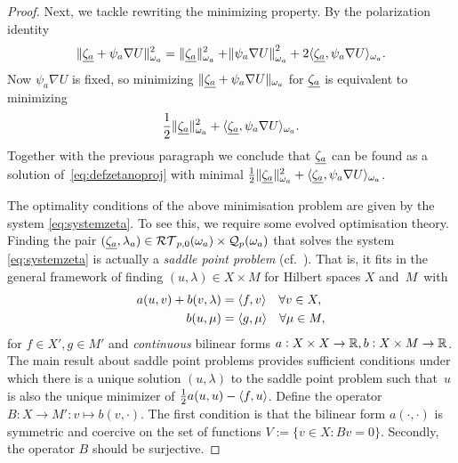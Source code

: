 \documentclass[thesis.tex]{subfiles}
\begin{document}
\begin{proof}
%
  Next, we tackle rewriting the minimizing property. By the polarization identity
  \[
    \| \underline{\zeta_a} + \psi_a \nabla U \|_{\omega_a}^2 = \| \underline{\zeta_a} \|_{\omega_a}^2 + \norm{\psi_a \nabla U}^2_{\omega_a} + 2 \langle \underline{\zeta_a}, \psi_a \nabla 
    U \rangle_{\omega_a}.
  \]
  Now $\psi_a \nabla U$ is fixed,  so minimizing $\| \underline{\zeta_a} + \psi_a \nabla U \|_{\omega_a}$ for $\underline{\zeta_a}$ is equivalent to minimizing
  \[
    \frac{1}{2} \| \underline{\zeta_a} \|^2_{\omega_a} + \langle \underline{\zeta_a}, \psi_a \nabla U \rangle_{\omega_a}.
  \]
  Together with the previous paragraph we conclude that $\underline{\zeta_a}$ can be found as a solution of~\eqref{eq:defzetanoproj} with
  minimal $\frac{1}{2} \| \underline{\zeta_a} \|^2_{\omega_a} + \langle \underline{\zeta_a}, \psi_a \nabla U \rangle_{\omega_a}$.

  The optimality conditions of the above minimisation problem are given by the system \eqref{eq:systemzeta}.
  To see this, we require some evolved optimisation theory. 
  Finding the pair $(\underline{\zeta_a}, {{\lambda_a}}) \in \mathcal{RT}_{p,0}(\omega_a) \times \mathcal{Q}_p(\omega_a)$ that solves the system 
  \eqref{eq:systemzeta} is actually a \emph{saddle point problem} (cf.~\cite{brezzimixed, braess2007finite}).
  That is, it fits in the general framework of finding $(u, \lambda) \in X \times M$ for Hilbert spaces $X$ and~$M$~with
    \begin{align*}
      a(u,v) + b(v,\lambda) &= \langle f,v \rangle \quad \forall v \in X,\\
      b(u, \mu) &= \langle g,\mu \rangle \quad \forall \mu \in M,
    \end{align*}
    for $f \in X', g \in M'$ and \emph{continuous} bilinear forms $a: X \times X \to \mathbb{R}, b : X \times M \to \mathbb{R}$.
    The main result about saddle point problems \cite[Thm~4.2.1]{brezzimixed} provides sufficient conditions under which there 
    is a unique solution $(u, \lambda)$ to the saddle point problem such that~$u$ is also the unique minimizer of 
    $\frac{1}{2} a(u,u) - \langle f,u \rangle$. Define the operator $B: X \to M' : v \mapsto b(v,\cdot)$. The first condition is that the bilinear form $a(\cdot, \cdot)$ is
    symmetric and coercive on the set of functions $V := \{v \in X : Bv = 0\}$.
    Secondly, the operator $B$ should be surjective.


\end{proof}
\end{document}
